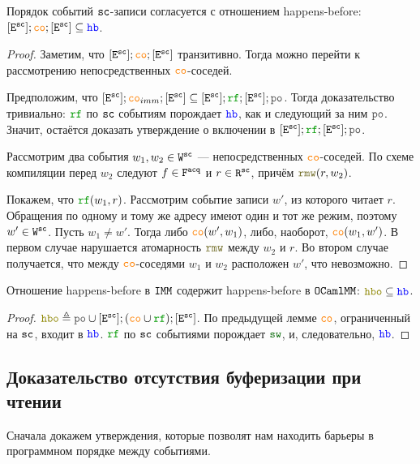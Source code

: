 \begin{lm}
  \label{sc-co-hb}
  Порядок событий ${\mathtt{sc}}$-записи согласуется с отношением happens-before: $[\lE^{\sco}] ; \lCO ; [\lE^{\sco}] \subseteq \lHB$. 
\end{lm}

\begin{proof}
  Заметим, что  $[\lE^{\sco}] ; \lCO ; [\lE^{\sco}]$ транзитивно. Тогда можно перейти к рассмотрению непосредственных $\lCO$-соседей. 

  Предположим, что $[\lE^{\sco}] ; \lCO_{imm} ; [\lE^{\sco}] \subseteq [\lE^{\sco}] ; \lRF ; [\lE^{\sco}] ; \lPO$. Тогда доказательство тривиально: $\lRF$ по ${\mathtt{sc}}$ событиям порождает $\lHB$, как и следующий за ним $\lPO$. Значит, остаётся доказать утверждение о включении в $[\lE^{\sco}] ; \lRF ; [\lE^{\sco}] ; \lPO$.

  Рассмотрим два события $w_1, w_2 \in {\mathtt{W}}^{{\mathtt{sc}}}$ --- непосредственных $\lCO$-соседей. По схеме компиляции перед $w_2$ следуют $f\in {\mathtt{F}}^{{\mathtt{acq}}}$ и $r \in {\mathtt{R}}^{{\mathtt{sc}}}$, причём $\lRMW(r, w_2)$.

  Покажем, что $\lRF(w_1, r)$. Рассмотрим событие записи $w'$, из которого читает $r$. Обращения по одному и тому же адресу имеют один и тот же режим, поэтому $w' \in {\mathtt{W}}^{\mathtt{sc}}$. 
  Пусть $w_1\neq w'$. Тогда либо $\lCO(w', w_1)$, либо, наоборот, $\lCO(w_1, w')$. В первом случае нарушается атомарность $\lRMW$ между $w_2$ и $r$. Во втором случае получается, что между $\lCO$-соседями $w_1$ и $w_2$ расположен $w'$, что невозможно. 
\end{proof}

\begin{lm}
  \label{hbo-in-hb}
  Отношение happens-before в $\mathtt{IMM}$ содержит happens-before в $\mathtt{OCaml}\allowbreak \mathtt{MM}$: $\lHBO \subseteq \lHB$. 
\end{lm}
\begin{proof}
  $\lHBO \defeq \lPO \cup [\lE^{\sco}] ; (\lCO \cup \lRF) ; [\lE^{\sco}]$. По предыдущей лемме $\lCO$, ограниченный на ${\mathtt{sc}}$, входит в $\lHB$. $\lRF$ по ${\mathtt{sc}}$ событиями порождает $\lSW$, и, следовательно, $\lHB$. 
\end{proof}

\subsection{Доказательство отсутствия буферизации при чтении}
\label{corr-causality}
Сначала докажем утверждения, которые позволят нам находить барьеры в программном порядке между событиями.

